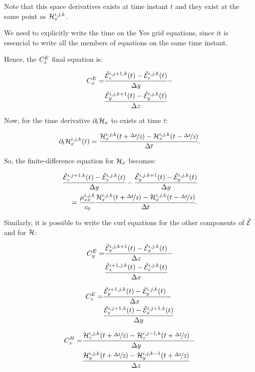 Note that this space derivatives exists at time instant $t$ and they exist at the same point as $\mathcal{H}_x^{i,j,k}$.

We need to explicitly write the time on the Yee grid equations, since it is essencial to write all the members of equations on the same time instant.

Hence, the $C_x^E$ final equation is:

\begin{eqnarray}
    C_x^E =& \cfrac{\tilde{\mathcal{E}}_z^{i, j+1, k}(t)-\tilde{\mathcal{E}}_z^{i, j, k}(t)}{\Delta y} - \nonumber \\ 
    \qquad & \cfrac{\tilde{\mathcal{E}}_y^{i, j, k+1}(t)-\tilde{\mathcal{E}}_y^{i, j, k}(t)}{\Delta z}
    \label{eq:CEx}
\end{eqnarray}

Now, for the time derivative $\partial_t \mathcal{H}_x$ to exists at time $t$:

\begin{equation}
    \partial_t \mathcal{H}_x^{i,j,k}(t) = \cfrac{\mathcal{H}_x^{i,j,k}(t+\nicefrac{\Delta t}{2}) - \mathcal{H}_x^{i,j,k}(t-\nicefrac{\Delta t}{2})}{\Delta t}.
\end{equation}

So, the finite-difference equation for $\mathcal{H}_x$ becomes:

\begin{eqnarray}
    \cfrac{\tilde{\mathcal{E}}_z^{i, j+1, k}(t)-\tilde{\mathcal{E}}_z^{i, j, k}(t)}{\Delta y} - \cfrac{\tilde{\mathcal{E}}_y^{i, j, k+1}(t)-\tilde{\mathcal{E}}_y^{i, j, k}(t)}{\Delta y} \nonumber \\ 
    =\cfrac{\mu_{xx}^{i,j,k}}{c_0}\cfrac{\mathcal{H}_x^{i,j,k}(t+\nicefrac{\Delta t}{2}) - \mathcal{H}_x^{i,j,k}(t-\nicefrac{\Delta t}{2})}{\Delta t}.
    \label{eq:fd_hx}
\end{eqnarray}

Similarly, it is possible to write the curl equations for the other components of $\tilde{\mathcal{E}}$ and for $\mathcal{H}$:

\begin{eqnarray}
    C_y^E =& \cfrac{\tilde{\mathcal{E}}_x^{i, j, k+1}(t)-\tilde{\mathcal{E}}_x^{i, j, k}(t)}{\Delta z} - \nonumber \\ 
    \qquad & \cfrac{\tilde{\mathcal{E}}_z^{i+1, j, k}(t)-\tilde{\mathcal{E}}_z^{i, j, k}(t)}{\Delta x}
    \label{eq:CEy}
\end{eqnarray}

\begin{eqnarray}
    C_z^E =& \cfrac{\tilde{\mathcal{E}}_y^{i+1, j, k}(t)-\tilde{\mathcal{E}}_y^{i, j, k}(t)}{\Delta x} - \nonumber \\ 
    \qquad & \cfrac{\tilde{\mathcal{E}}_x^{i, j+1, k}(t)-\tilde{\mathcal{E}}_x^{i, j+1, k}(t)}{\Delta y}
    \label{eq:CEz}
\end{eqnarray}

\begin{eqnarray}
    C_x^H =& \cfrac{\mathcal{H}_z^{i, j, k}(t+\nicefrac{\Delta t}{2})-\mathcal{H}_z^{i, j-1, k}(t+\nicefrac{\Delta t}{2})}{\Delta y} - \nonumber \\ 
    \qquad & \cfrac{\mathcal{H}_y^{i, j, k}(t+\nicefrac{\Delta t}{2})-\mathcal{H}_y^{i, j, k-1}(t+\nicefrac{\Delta t}{2})}{\Delta z}
    \label{eq:CHx}
\end{eqnarray}


